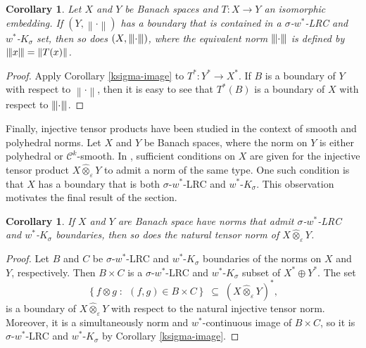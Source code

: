 \documentclass[12pt,reqno]{amsart}
\newcommand{\ball}[1]{\ensuremath{B_{#1}}}
\newcommand{\dual}[1]{\ensuremath{{#1}^*}}
\newcommand{\itp}[2]{\ensuremath{{#1}\hat{\otimes}_{\varepsilon}{#2}}}
\newcommand{\map}[3]{\ensuremath{{#1}:{#2}\to{#3}}}
\newcommand{\n}[1]{\ensuremath{\left\|{#1}\right\|}}
\newcommand{\ndot}{\ensuremath{\left\|\cdot\right\|}}
\newcommand{\set}[2]{\ensuremath{\left\{{#1}\;:\;\,{#2}\right\}}}
\newcommand{\tn}[1]{\ensuremath{\left|\kern-.9pt\left|\kern-.9pt\left|{#1}\right|\kern-.9pt\right|\kern-.9pt\right|}}
\newcommand{\tndot}{\ensuremath{\left|\kern-.9pt\left|\kern-.9pt\left|\cdot\right|\kern-.9pt\right|\kern-.9pt\right|}}
\newcommand{\tp}[2]{\ensuremath{{#1}\otimes{#2}}}
\newcommand{\weakstar}{\ensuremath{w^*}}
\newtheorem{cor}[thm]{Corollary}
\newtheorem{prop}[thm]{Proposition}
\theoremstyle{definition}
\begin{document}
\begin{cor}
Let $X$ and $Y$ be Banach spaces and $\map{T}{X}{Y}$ an isomorphic embedding. If $(Y,\ndot)$ has a boundary that is contained in a $\sigma$-$\weakstar$-LRC and $\weakstar$-$K_\sigma$ set, then so does $(X,\tndot)$, where the equivalent norm $\tndot$ is defined by
$\tn{x} = \n{T(x)}$.
\end{cor}

\begin{proof}
Apply Corollary \ref{ksigma-image} to $\map{T^*}{Y^*}{X^*}$. If $B$ is a boundary of $Y$ with respect to $\ndot$, then it is easy to see that $T^*(B)$ is a boundary of $X$ with respect to $\tndot$.
\end{proof}

Finally, injective tensor products have been studied in the context of smooth and polyhedral norms. Let $X$ and $Y$ be Banach spaces, where the norm on $Y$ is either polyhedral or $\mathscr{C}^k$-smooth. In \cite{bible:14,fpst:08,haydon:96}, sufficient conditions on $X$ are given for the injective tensor product $\itp{X}{Y}$ to admit a norm of the same type. One such condition is that $X$ has a boundary that is both $\sigma$-$w^*$-LRC and $w^*$-$K_\sigma$. This observation motivates the final result of the section.

\begin{cor}
If $X$ and $Y$ are Banach space have norms that admit $\sigma$-$w^*$-LRC and $w^*$-$K_\sigma$ boundaries, then so does the natural tensor norm of $\itp{X}{Y}$. 
\end{cor}

\begin{proof}
Let $B$ and $C$ be $\sigma$-$w^*$-LRC and $w^*$-$K_\sigma$ boundaries of the norms on $X$ and $Y$, respectively. Then $B\times C$ is a $\sigma$-$w^*$-LRC and $w^*$-$K_\sigma$ subset of $X^*\oplus Y^*$. The set
\[
\set{\tp{f}{g}}{(f,g) \in B\times C} \;\subseteq \; (\itp{X}{Y})^*,
\]
is a boundary of $\itp{X}{Y}$ with respect to the natural injective tensor norm. Moreover, it is a simultaneously norm and $w^*$-continuous image of $B\times C$, so it is $\sigma$-$w^*$-LRC and $w^*$-$K_\sigma$ by Corollary \ref{ksigma-image}.
\end{proof}

%
%
\end{document}
